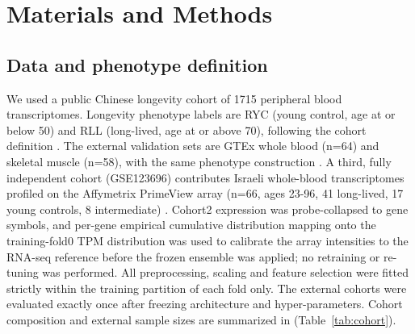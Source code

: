 \documentclass[unnumsec,webpdf,contemporary,large]{oup-authoring-template}
\begin{document}
\section{Materials and Methods}\label{sec:methods}
\subsection{Data and phenotype definition}\label{sec:data}
We used a public Chinese longevity cohort of 1715 peripheral blood transcriptomes. Longevity phenotype labels are RYC (young control, age at or below 50) and RLL (long-lived, age at or above 70), following the cohort definition \cite{sebastiani2012genetic,deelen2019meta}. The external validation sets are GTEx whole blood (n=64) and skeletal muscle (n=58), with the same phenotype construction \cite{gtex2015consortium,gtex2020consortium}. A third, fully independent cohort (GSE123696) contributes Israeli whole-blood transcriptomes profiled on the Affymetrix PrimeView array (n=66, ages 23-96, 41 long-lived, 17 young controls, 8 intermediate) \cite{alpert_2019}. Cohort2 expression was probe-collapsed to gene symbols, and per-gene empirical cumulative distribution mapping onto the training-fold0 TPM distribution was used to calibrate the array intensities to the RNA-seq reference before the frozen ensemble was applied; no retraining or re-tuning was performed. All preprocessing, scaling and feature selection were fitted strictly within the training partition of each fold only. The external cohorts were evaluated exactly once after freezing architecture and hyper-parameters. Cohort composition and external sample sizes are summarized in (Table~\ref{tab:cohort}).
\end{document}
